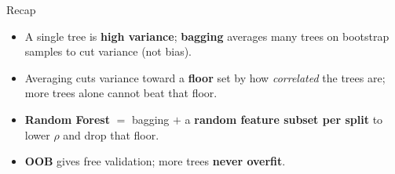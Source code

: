\documentclass[aspectratio=169]{beamer}
\begin{document}
\begin{frame}{Recap}
  \begin{itemize}\small
    \item A single tree is \textbf{high variance}; \textbf{bagging} averages many trees on
      bootstrap samples to cut variance (not bias).
    \item Averaging cuts variance toward a \textbf{floor} set by how \emph{correlated} the
      trees are; more trees alone cannot beat that floor.
    \item \textbf{Random Forest} $=$ bagging $+$ a \textbf{random feature subset per split}
      to lower $\rho$ and drop that floor.
    \item \textbf{OOB} gives free validation; more trees \textbf{never overfit}.
  \end{itemize}
  \vfill
\end{frame}
\end{document}
